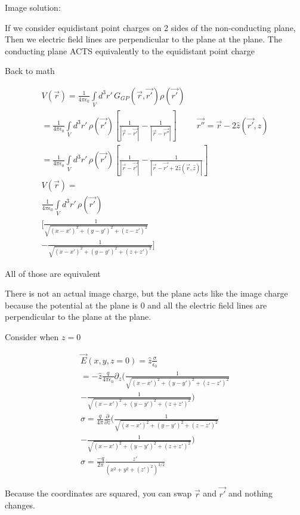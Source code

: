 \documentclass[fleqn]{report}
\newcommand{\hp}{\hspace{1cm}}
\newcommand{\del}{\partial}
\newcommand{\equations} [1] {
\begin{gather*}
#1
\end{gather*}
}
\begin{document}
Image solution:

If we consider equidistant point charges on 2 sides of the non-conducting plane, 
Then we electric field lines are perpendicular to the plane at the plane. 
The conducting plane ACTS equivalently to the equidistant point charge 

Back to math

\equations{
    V(\vec r) = 
    \frac{1}{4 \pi \epsilon_0}
    \int\limits_{V} d^3 r' \, 
    G_{GP} (\vec r, \vec{r'}) \rho(\vec{r'})
    \\
    =
    \frac{1}{4 \pi \epsilon_0}
    \int\limits_{V} d^3 r' \, 
    \rho(\vec{r'})
    \left[
        \frac{1}{|\vec r - \vec{r'}|}
        -
        \frac{1}{|\vec r - \vec{r''}|}
    \right]
    \hp
    \vec{r''} = \vec r - 2 \hat z(\vec{r'}, z)
    \\
    =
    \frac{1}{4 \pi \epsilon_0}
    \int\limits_{V} d^3 r' \, 
    \rho(\vec{r'})
    \left[
        \frac{1}{|\vec r - \vec{r'}|}
        -
        \frac{1}{|\vec r - \vec{r'} + 2 \hat z(\vec r, \hat z)|}
    \right]
    \\
    V(\vec r)
    =
    \\
    \frac{1}{4 \pi \epsilon_0}
    \int\limits_{V} d^3 r' \, 
    \rho(\vec{r'})
    \\
    \Big[
        \frac{1}
        { \sqrt{(x - x')^2 + (y - y')^2 + (z - z')^2} }
        \\
        -
        \frac{1}
        { \sqrt{(x - x')^2 + (y - y')^2 + (z + z')^2} }
    \Big]
}

All of those are equivalent 

There is not an actual image charge, but the plane acts like the 
image charge because the potential at the plane is 0 and 
all the electric field lines are perpendicular to the plane at the plane. 

Consider when $z = 0$
\equations{
    \vec E(x, y, z = 0)
    =
    \hat z \frac{\sigma}{\epsilon_0}
    \\
    =
    -\hat z \frac{q}{4 \pi \epsilon_0} \del_z 
    \Big(
        \frac{1}
        { \sqrt{(x - x')^2 + (y - y')^2 + (z - z')^2} }
        \\
        -
        \frac{1}
        { \sqrt{(x - x')^2 + (y - y')^2 + (z + z')^2} }
    \Big)
    \\
    \sigma 
    =
    \frac{q}{4 \pi}
    \frac{\del}{\del z}
    \Big(
        \frac{1}
        { \sqrt{(x - x')^2 + (y - y')^2 + (z - z')^2} }
        \\
        -
        \frac{1}
        { \sqrt{(x - x')^2 + (y - y')^2 + (z + z')^2} }
    \Big)
    \\
    \sigma 
    =
    \frac{-q}{2 \pi}
    \frac{z'}{(x^2 + y^2 + (z')^2)^{3/2}}
}
Because the coordinates are squared, you can swap $\vec{r}$ and $\vec{r'}$ 
and nothing changes. 
\end{document}
